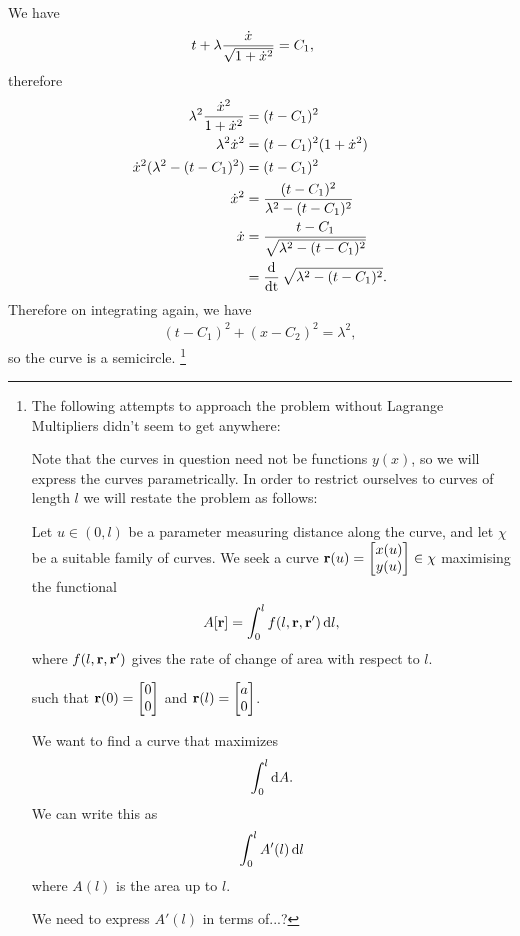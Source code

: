 We have
\begin{align*}
  t + \lambda \frac{\dot{x}}{\sqrt{1 + \dot{x}^2}} &= C_1,
\end{align*}
therefore
\begin{align*}
  \lambda^2 \frac{\dot{x}^2}{1 + \dot{x}^2} &= (t - C_1)^2 \\
  \lambda^2 \dot{x}^2 &= (t - C_1)^2(1 + \dot{x}^2) \\
  \dot{x}^2(\lambda^2 - (t - C_1)^2) &= (t - C_1)^2 \\
  \dot{x}^2 &= \frac{(t - C_1)^2}{\lambda^2 - (t - C_1)^2} \\
  \dot{x} &= \frac{t - C_1}{\sqrt{\lambda^2 - (t - C_1)^2}} \\
        &= \operatorname{\frac{\text{d}}{\text{dt}}} \sqrt{\lambda^2 - (t - C_1)^2}.
\end{align*}
Therefore on integrating again, we have
\begin{align*}
  (t - C_1)^2 + (x - C_2)^2 = \lambda^2,
\end{align*}
so the curve is a semicircle.
\footnote{
  The following attempts to approach the problem without Lagrange Multipliers didn't seem to get anywhere:

  Note that the curves in question need not be functions $y(x)$, so we will express the curves
  parametrically. In order to restrict ourselves to curves of length $l$ we will restate the problem
  as follows:

  Let $u \in (0, l)$ be a parameter measuring distance along the curve, and let $\chi$ be a suitable family of
  curves. We seek a curve $\mathbf{r}(u) = \begin{bmatrix}x(u)\\y(u)\end{bmatrix} \in \chi$ maximising the functional
\begin{align*}
  A[\r] = \int_0^l f(l, \r, \r') \d l,
\end{align*}
where $f(l, \mathbf{r}, \mathbf{r}')$ gives the rate of change of area with respect to $l$.

such that $\mathbf{r}(0) = \begin{bmatrix}0\\0\end{bmatrix}$ and $\mathbf{r}(l) = \begin{bmatrix}a\\0\end{bmatrix}$.

We want to find a curve that maximizes
\begin{align*}
  \int_0^l \d A.
\end{align*}
We can write this as
\begin{align*}
  \int_0^l A'(l) \d l
\end{align*}
where $A(l)$ is the area up to $l$.

We need to express $A'(l)$ in terms of...?
}

